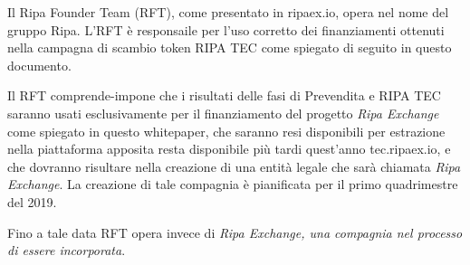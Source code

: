 \documentclass[11pt,fleqn,oneside]{book} %
\begin{document}
Il Ripa Founder Team (RFT), come presentato in ripaex.io, opera nel nome del gruppo Ripa. L'RFT è responsaile per l'uso corretto dei finanziamenti
ottenuti nella campagna di scambio token RIPA TEC come spiegato di seguito in questo documento.

Il RFT comprende-impone che i risultati delle fasi di Prevendita e RIPA TEC saranno usati esclusivamente per il finanziamento del progetto 
\emph{Ripa Exchange} come spiegato in questo whitepaper, che saranno resi disponibili per estrazione nella piattaforma apposita resta disponibile
più tardi quest'anno tec.ripaex.io, e che dovranno risultare nella creazione di una entità legale che sarà chiamata \emph{Ripa Exchange}. La creazione di tale 
compagnia è pianificata per il primo quadrimestre del 2019.

Fino a tale data RFT opera invece di \emph{Ripa Exchange, una compagnia nel processo di essere incorporata}.




\end{document}
